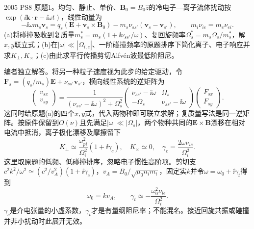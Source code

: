 \begin{exercise}\label{ex:hist05-8-1}
2005 PS8 原题1。均匀、静止、单价、$\mathbf B_0=B_0\hat z$的冷电子—离子流体扰动按$\exp(\ii\mathbf k\cdot\mathbf r-\ii\omega t)$，线性动量为
\begin{equation}
-\ii\omega m_s\mathbf v_s=q_s(\mathbf E+\mathbf v_s\times\mathbf B_0)-m_s\nu_{ss'}(\mathbf v_s-\mathbf v_{s'}),\qquad m_i\nu_{ie}=m_e\nu_{ei}.
\end{equation}
(a)将碰撞吸收到复质量$m_s^*=m_s(1+\ii\nu_{ss'}/\omega)$、复回旋频率$\Omega_s^*=m_s\Omega_s/m_s^*$，解$x,y$联立式；(b)在$|\omega|\ll|\Omega_{i,e}|$、一阶碰撞频率的原题排序下简化离子、电子响应并求$K_\perp,K_\times$；(c)由此求平行传播剪切Alfv\'en波最低阶阻尼。
\end{exercise}
\begin{solution}
编者独立解答。将另一种粒子速度视为此步的给定驱动，令$\mathbf F_s=(q_s/m_s)\mathbf E+\nu_{ss'}\mathbf v_{s'}$，横向线性系统的逆矩阵为
\begin{equation}
\begin{pmatrix}v_{sx}\\v_{sy}\end{pmatrix}
=\frac1{(\nu_{ss'}-\ii\omega)^2+\Omega_s^2}
\begin{pmatrix}\nu_{ss'}-\ii\omega&\Omega_s\\-\Omega_s&\nu_{ss'}-\ii\omega\end{pmatrix}
\begin{pmatrix}F_{sx}\\F_{sy}\end{pmatrix}.
\end{equation}
这同时给原题(a)的四个$x,y$式，代入两物种即可联立求解；复质量写法是同一逆矩阵。按原件保留到$O(\nu)$且先满足$|\omega|\ll|\Omega_s|$，两个物种共同的$\mathbf E\times\mathbf B$漂移在相对电流中抵消，离子极化漂移及摩擦留下
\begin{equation}
K_\perp\simeq\frac{\omega_{pi}^2}{\Omega_i^2}\left(1+\ii\gamma_c\right),\quad K_\times\simeq0,\quad
\gamma_c=\frac{2\omega\nu_{ie}}{\Omega_i^2}.
\end{equation}
这里取原题的低频、低碰撞排序，忽略电子惯性高阶项。剪切支$c^2k^2/\omega^2\simeq(c^2/v_A^2)(1+\ii\gamma_c)$，$v_A=B_0/\sqrt{\mu_0n_im_i}$，固定实$k$并令$\omega=\omega_0+\ii\gamma_t$得到
\begin{equation}\omega_0=kv_A,\qquad \gamma_t\simeq-\frac{\omega_0^2\nu_{ie}}{\Omega_i^2}.\end{equation}
$\gamma_c$是介电张量的小虚系数，$\gamma_t$才是有量纲阻尼率；不能混名。接近回旋共振或碰撞并非小扰动时此展开无效。
\end{solution}


